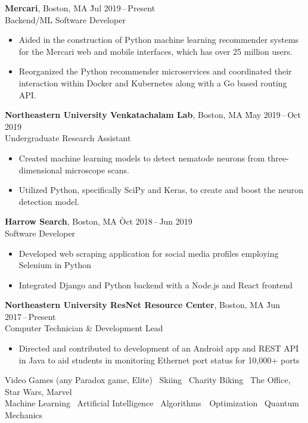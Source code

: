 \documentclass[11pt]{article}
\newcommand{\ressection}[1]{%
  \vspace{12pt}{\Large{\textsc{#1}}} \titlerule[0.5pt] \par
}
\begin{document}
\ressection{Work Experience}

\begin{tabbing}
  \textbf{Mercari}, Boston, MA \` Jul 2019\,--\,Present \\
  Backend/ML Software Developer
\end{tabbing}
\begin{itemize}
  \item Aided in the construction of Python machine learning recommender systems for the Mercari web and mobile interfaces, which has over 25 million users. 
  \item Reorganized the Python recommender microservices and coordinated their interaction within Docker and Kubernetes along with a Go based routing API. 
\end{itemize}

\begin{tabbing}
  \textbf{Northeastern University Venkatachalam Lab}, Boston, MA \` May 2019\,--\,Oct 2019 \\
  Undergraduate Research Assistant
\end{tabbing}
\begin{itemize}
  \item Created machine learning models to detect nematode neurons from three-dimensional microscope scans.
  \item Utilized Python, specifically SciPy and Keras, to create and boost the neuron detection model.
\end{itemize}

\begin{tabbing}
  \textbf{Harrow Search}, Boston, MA \` Oct 2018\,--\,Jun 2019 \\
  Software Developer
\end{tabbing}
\begin{itemize}
  \item Developed web scraping application for social media profiles employing Selenium in Python
  \item Integrated Django and Python backend with a Node.js and React frontend
\end{itemize}

\begin{tabbing}
  \textbf{Northeastern University ResNet Resource Center}, Boston, MA \` Jun 2017\,--\,Present \\
  Computer Technician \& Development Lead
\end{tabbing}
\begin{itemize}
  \item Directed and contributed to development of an Android app and REST API in Java to aid students in monitoring Ethernet port status for 10,000+ ports
\end{itemize}

\ressection{Interests}
\begin{center}
Video Games (any Paradox game, Elite) \textbullet\ Skiing \textbullet\ Charity Biking \textbullet\ The Office, Star Wars, Marvel \\
Machine Learning \textbullet\ Artificial Intelligence \textbullet\ Algorithms\ \textbullet\ Optimization \textbullet\ Quantum Mechanics
\end{center}
\end{document}
